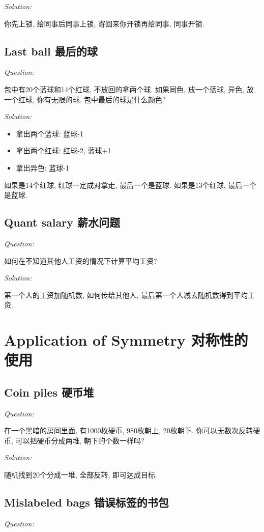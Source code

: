 \documentclass[12pt]{book}
\begin{document}
\noindent \textit{Solution:} 

你先上锁, 给同事后同事上锁, 寄回来你开锁再给同事, 同事开锁.

\subsection{Last ball 最后的球}
\noindent \textit{Question:}

包中有20个蓝球和14个红球, 不放回的拿两个球. 如果同色, 放一个蓝球, 异色, 放一个红球, 你有无限的球. 包中最后的球是什么颜色?

\noindent \textit{Solution:} 

\begin{itemize}
  \item 拿出两个蓝球: 蓝球-1
  \item 拿出两个红球: 红球-2, 蓝球+1
  \item 拿出异色: 蓝球-1
\end{itemize}

如果是14个红球, 红球一定成对拿走, 最后一个是蓝球.
如果是13个红球, 最后一个是蓝球.

\subsection{Quant salary 薪水问题}
\noindent \textit{Question:}

如何在不知道其他人工资的情况下计算平均工资?

\noindent \textit{Solution:} 

第一个人的工资加随机数, 如何传给其他人, 最后第一个人减去随机数得到平均工资.

\section{Application of Symmetry 对称性的使用}
\subsection{Coin piles 硬币堆}
\noindent \textit{Question:}

在一个黑暗的房间里面, 有1000枚硬币, 980枚朝上, 20枚朝下. 你可以无数次反转硬币, 可以把硬币分成两堆, 朝下的个数一样吗?

\noindent \textit{Solution:} 

随机找到20个分成一堆, 全部反转, 即可达成目标.

\subsection{Mislabeled bags 错误标签的书包}
\noindent \textit{Question:}
\end{document}
